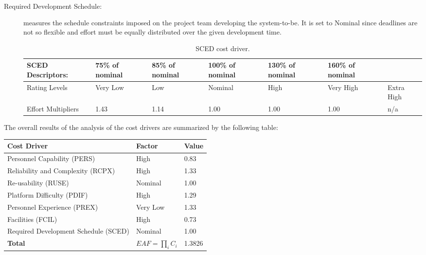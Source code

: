 \begin{description}
\item[Required Development Schedule:] measures the schedule constraints imposed on the project team developing the system-to-be. It is set to Nominal since deadlines are not so flexible and effort must be equally distributed over the given development time.

\begin{table}[H]
	\begin{adjustwidth}{-.5in}{-.5in}
    \centering
    \begin{tabular}{p{3.6cm}|p{1.5cm}|p{1.5cm}|p{1.5cm}|p{1.5cm}|p{1.5cm}|p{1cm}}
    	\hline
        SCED Descriptors: & 75\% of nominal & 85\% of nominal & 100\% of nominal & 130\% of nominal & 160\% of nominal & \\
        \hline
        Rating Levels & Very Low & Low & Nominal & High & Very High & Extra High \\
        \hline
        Effort Multipliers & 1.43 & 1.14 & 1.00 & 1.00 & 1.00 & n/a \\
        \hline
    \end{tabular}
    \caption{SCED cost driver.}
    \end{adjustwidth}
\end{table}

\end{description}

\noindent
The overall results of the analysis of the cost drivers are summarized by the following table:

\begin{table}[H]
    \centering
    \begin{tabular}{l|l|l}
    	\hline
    	Cost Driver & Factor & Value \\
        \hline
        \hline
        Personnel Capability (PERS) & High & 0.83 \\
        \hline
        Reliability and Complexity (RCPX) & High & 1.33 \\
        \hline
        Re-usability (RUSE) & Nominal & 1.00 \\
        \hline
        Platform Difficulty (PDIF) & High & 1.29 \\
        \hline
        Personnel Experience (PREX) & Very Low & 1.33 \\
        \hline
        Facilities (FCIL) & High & 0.73 \\
        \hline
        Required Development Schedule (SCED) & Nominal & 1.00 \\
        \hline
        \textbf{Total}  & $EAF=\prod_i C_i$ & 1.3826 \\
        \hline
    \end{tabular}
\end{table}

